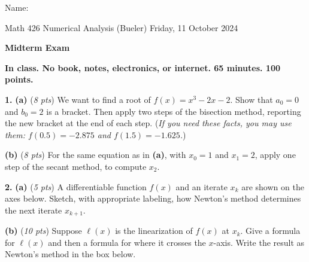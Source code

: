 \documentclass[11pt]{amsart}
\newcommand{\prob}[1]{\bigskip\noindent\textbf{#1.} }
\newcommand{\pts}[1]{(\emph{#1 pts})}
\newcommand{\ppartpts}[2]{\textbf{(#1)} \pts{#2} \quad}
\newcommand{\epartpts}[2]{\medskip\noindent \textbf{(#1)} \pts{#2} \quad}
\begin{document}
\hfill \Large Name:\underline{\phantom{Ed Bueler really really long long long name}}
\medskip

\scriptsize \noindent Math 426 Numerical Analysis (Bueler) \hfill Friday, 11 October 2024
\medskip

\Large\centerline{\textbf{Midterm Exam}}

\smallskip
\large
\begin{center}
\textbf{In class.  No book, notes, electronics, or internet.  65 minutes.  100 points.}
\end{center}

\medskip

\thispagestyle{empty}

\prob{1} \ppartpts{a}{8}  We want to find a root of $f(x)=x^3 - 2x - 2$.  Show that $a_0=0$ and $b_0=2$ is a bracket.  Then apply two steps of the bisection method, reporting the new bracket at the end of each step.  (\emph{If you need these facts, you may use them: $f(0.5) = -2.875$ and $f(1.5)=-1.625$.})
\vfill

\epartpts{b}{8}  For the same equation as in \textbf{(a)}, with $x_0=1$ and $x_1=2$, apply one step of the secant method, to compute $x_2$.
\vfill

\newpage
\prob{2}  \ppartpts{a}{5}  A differentiable function $f(x)$ and an iterate $x_k$ are shown on the axes below.  Sketch, with appropriate labeling, how Newton's method determines the next iterate $x_{k+1}$.

\begin{center}
\end{center}

\medskip

\epartpts{b}{10} Suppose $\ell(x)$ is the linearization of $f(x)$ at $x_k$.  Give a formula for $\ell(x)$ and then a formula for where it crosses the $x$-axis.  Write the result as Newton's method in the box below.

\vfill

\qquad {}
\end{document}
